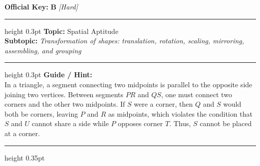 \documentclass[a4paper,10pt]{article}
\begin{document}
\begin{tcolorbox}
\tcblower

\textbf{Official Key:} \textbf{\large B} \hfill \textit{\small [Hard]}
\vspace{2pt}\hrule height 0.3pt\vspace{3pt}
\textbf{Topic:} Spatial Aptitude \\
\textbf{Subtopic:} \textit{Transformation of shapes: translation, rotation, scaling, mirroring, assembling, and grouping}
\vspace{2pt}\hrule height 0.3pt\vspace{3pt}
\textbf{Guide / Hint:} \\
{\small In a triangle, a segment connecting two midpoints is parallel to the opposite side joining two vertices. Between segments $PR$ and $QS$, one must connect two corners and the other two midpoints. If $S$ were a corner, then $Q$ and $S$ would both be corners, leaving $P$ and $R$ as midpoints, which violates the condition that $S$ and $U$ cannot share a side while $P$ opposes corner $T$. Thus, $S$ cannot be placed at a corner.}

\end{tcolorbox}
\vspace{6pt}\hrule height 0.35pt\vspace{6pt}
\noindent
\end{document}
